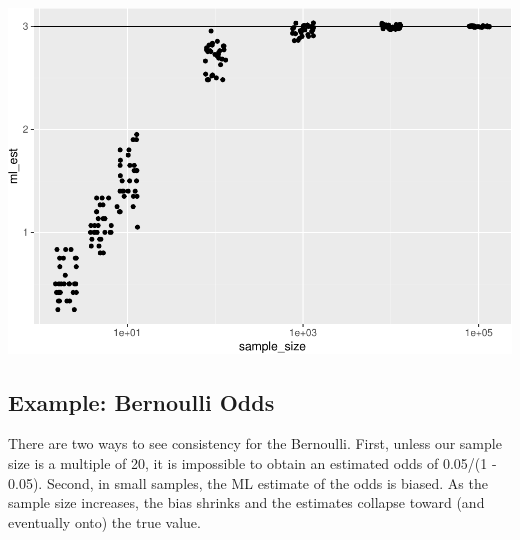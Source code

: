\documentclass[
]{book}
\begin{document}
\includegraphics{01-04-bias-and-consistency_files/figure-latex/unnamed-chunk-7-1.pdf}

\hypertarget{example-bernoulli-odds-1}{%
\subsection{Example: Bernoulli Odds}\label{example-bernoulli-odds-1}}

There are two ways to see consistency for the Bernoulli. First, unless our sample size is a multiple of 20, it is impossible to obtain an estimated odds of 0.05/(1 - 0.05). Second, in small samples, the ML estimate of the odds is biased. As the sample size increases, the bias shrinks and the estimates collapse toward (and eventually onto) the true value.
\end{document}
